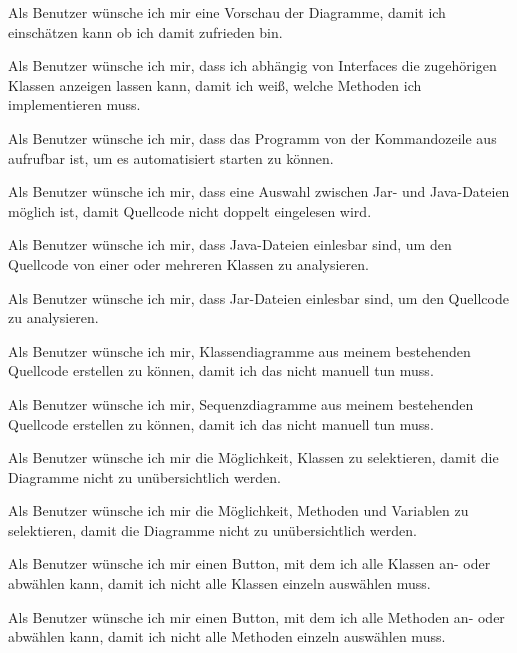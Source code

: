 Als Benutzer wünsche ich mir eine Vorschau der Diagramme, damit ich einschätzen kann ob ich damit zufrieden bin.
\nsecend

Als Benutzer wünsche ich mir, dass ich abhängig von Interfaces die zugehörigen Klassen anzeigen lassen kann, damit ich weiß, welche Methoden ich implementieren muss.
\nsecend

Als Benutzer wünsche ich mir, dass das Programm von der Kommandozeile aus aufrufbar ist, um es automatisiert starten zu können.
\nsecend

Als Benutzer wünsche ich mir, dass eine Auswahl zwischen Jar- und Java-Dateien möglich ist, damit Quellcode nicht doppelt eingelesen wird.
\nsecend

Als Benutzer wünsche ich mir, dass Java-Dateien einlesbar sind, um den Quellcode von einer oder mehreren Klassen zu analysieren.
\nsecend

Als Benutzer wünsche ich mir, dass Jar-Dateien einlesbar sind, um den Quellcode zu analysieren.
\nsecend
\nsecend

Als Benutzer wünsche ich mir, Klassendiagramme aus meinem bestehenden Quellcode erstellen zu können, damit ich das nicht manuell tun muss.
\nsecend

Als Benutzer wünsche ich mir, Sequenzdiagramme aus meinem bestehenden Quellcode erstellen zu können, damit ich das nicht manuell tun muss.
\nsecend

Als Benutzer wünsche ich mir die Möglichkeit, Klassen zu selektieren, damit die Diagramme nicht zu unübersichtlich werden.
\nsecend

Als Benutzer wünsche ich mir die Möglichkeit, Methoden und Variablen zu selektieren, damit die Diagramme nicht zu unübersichtlich werden.
\nsecend

Als Benutzer wünsche ich mir einen Button, mit dem ich alle Klassen an- oder abwählen kann, damit ich nicht alle Klassen einzeln auswählen muss.
\nsecend

Als Benutzer wünsche ich mir einen Button, mit dem ich alle Methoden an- oder abwählen kann, damit ich nicht alle Methoden einzeln auswählen muss.
\nsecend


